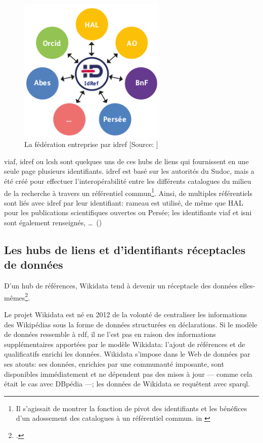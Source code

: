 \begin{figure}[!h]
	\centering
	\includegraphics[width=7cm]{images/idref.png}
	\caption[La fédération entreprise par \ac{idref}]{La fédération entreprise par \ac{idref} [Source: \cite[p.9]{aymonin_arabesques_2017}]}
	\label{idref_schema}
\end{figure}

\ac{viaf}, \ac{idref} ou \ac{lcsh} sont quelques uns de ces hubs de liens qui fournissent en une seule page plusieurs identifiants. \ac{idref} est basé sur les autorités du Sudoc, mais a été créé pour effectuer l'interopérabilité entre les différents catalogues du milieu de la recherche à travers un référentiel commun\footnote{\og Il s’agissait de montrer la fonction de pivot des identifiants et les bénéfices d’un adossement des catalogues à un référentiel commun.\fg{} in \cite[p.9]{aymonin_arabesques_2017}}. Ainsi, de multiples référentiels sont liés avec \ac{idref} par leur identifiant: \ac{rameau} est utilisé, de même que HAL pour les publications scientifiques ouvertes ou Persée; les identifiants \ac{viaf} et \ac{isni} sont également renseignés, \dots~()


\subsection{\label{III-A-2-c}Les hubs de liens et d'identifiants réceptacles de données}

\begin{citationLongue}
	D’un hub de références, Wikidata tend à devenir un réceptacle des données elles-mêmes\footcite{poupeau_au-a_2018}.
\end{citationLongue}
\medskip

Le projet Wikidata est né en 2012 de la volonté de centraliser les informations des Wikipédias sous la forme de données structurées en déclarations. Si le modèle de données ressemble à \ac{rdf}, il ne l'est pas en raison des informations supplémentaires apportées par le modèle Wikidata: l'ajout de références et de qualificatifs enrichi les données. Wikidata s'impose dans le Web de données par ses atouts: ses données, enrichies par une communauté imposante, sont disponibles immédiatement et ne dépendent pas des mises à jour --- comme cela était le cas avec DBpédia ---; les données de Wikidata se requêtent avec \ac{sparql}.\\

